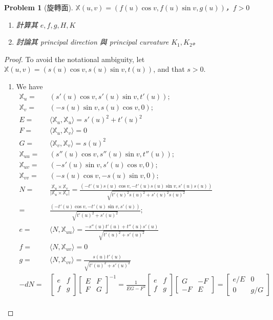 \documentclass[10pt,a4paper]{article}
\newcounter{theProblemCounter}
\newtheorem{problem}[theProblemCounter]{Problem}
\begin{document}
\setcounter{theProblemCounter}{8}
\begin{problem}[旋轉面]
$\mathbb{X}(u, v)=(f(u)\cos v, f(u)\sin v, g(u))$，$f>0$ \begin{enumerate}
\item[(a)] 計算其 $e, f, g, H, K$
\item[(b)] 討論其 principal direction 與 principal curvature $K_1, K_2$。
\end{enumerate}
\end{problem}
\begin{proof}
To avoid the notational ambiguity, let $\mathbb{X}(u, v)=(s(u)\cos v, s(u)\sin v, t(u))$, and that $s>0$. \begin{enumerate}
\item[(a)] We have
\begin{align*}
\mathbb{X}_u =& (s'(u)\cos v, s'(u)\sin v, t'(u)); \\
\mathbb{X}_v =& (-s(u)\sin v, s(u)\cos v, 0); \\
E =& \langle \mathbb{X}_u, \mathbb{X}_u\rangle = s'(u)^2 + t'(u)^2 \\
F =& \langle \mathbb{X}_u, \mathbb{X}_v\rangle = 0 \\
G =& \langle \mathbb{X}_v, \mathbb{X}_v\rangle = s(u)^2 \\
\mathbb{X}_{uu} =& (s''(u)\cos v, s''(u)\sin v, t''(u)); \\
\mathbb{X}_{uv} =& (-s'(u)\sin v, s'(u)\cos v, 0); \\
\mathbb{X}_{vv} =& (-s(u)\cos v, -s(u)\sin v, 0); \\
N =& \frac{\mathbb{X}_u \times \mathbb{X}_v}{|\mathbb{X}_u \times \mathbb{X}_v|} = \frac{(-t'(u)s(u)\cos v, -t'(u)s(u)\sin v, s'(u)s(u))}{\sqrt{t'(u)^2s(u)^2 + s'(u)^2s(u)^2}} \\
  =& \frac{(-t'(u)\cos v, -t'(u)\sin v, s'(u))}{\sqrt{t'(u)^2 + s'(u)^2}}; \\
e =& \langle N, \mathbb{X}_{uu}\rangle = \frac{-s''(u)t'(u) + t''(u)s'(u)}{\sqrt{t'(u)^2 + s'(u)^2}} \\
f =& \langle N, \mathbb{X}_{uv}\rangle = 0 \\
g =& \langle N, \mathbb{X}_{vv}\rangle = \frac{s(u)t'(u)}{\sqrt{t'(u)^2 + s'(u)^2}} \\
-dN =& \left[\begin{array}{cc}e & f \\ f & g\end{array}\right]\left[\begin{array}{cc}E & F \\ F & G\end{array}\right]^{-1} = \frac 1{EG - F^2}\left[\begin{array}{cc}e & f \\ f & g\end{array}\right]\left[\begin{array}{cc}G & -F \\ -F & E\end{array}\right] = \left[\begin{array}{cc}e/E & 0 \\ 0 & g/G\end{array}\right]\\

\end{align*}
\end{enumerate}
\end{proof}
\end{document}
